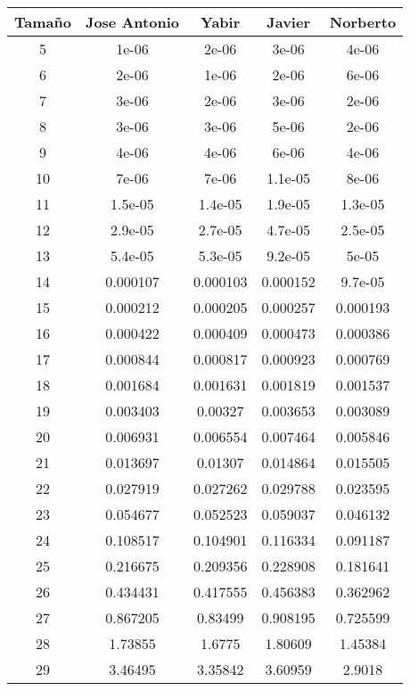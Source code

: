 \documentclass{article}
\begin{document}
 \newpage
{}

\begin{tabular}{ | c | c  | c | c | c | }
  \hline
   Tama\~no & Jose Antonio & Yabir & Javier & Norberto\\ 
   \hline
5	&	1e-06	&	2e-06	&	3e-06	&	4e-06	\\
6	&	2e-06	&	1e-06	&	2e-06	&	6e-06	\\
7	&	3e-06	&	2e-06	&	3e-06	&	2e-06	\\
8	&	3e-06	&	3e-06	&	5e-06	&	2e-06	\\
9	&	4e-06	&	4e-06	&	6e-06	&	4e-06	\\
10	&	7e-06	&	7e-06	&	1.1e-05	&	8e-06	\\
11	&	1.5e-05	&	1.4e-05	&	1.9e-05	&	1.3e-05	\\
12	&	2.9e-05	&	2.7e-05	&	4.7e-05	&	2.5e-05	\\
13	&	5.4e-05	&	5.3e-05	&	9.2e-05	&	5e-05	\\
14	&	0.000107	&	0.000103	&	0.000152	&	9.7e-05	\\
15	&	0.000212	&	0.000205	&	0.000257	&	0.000193	\\
16	&	0.000422	&	0.000409	&	0.000473	&	0.000386	\\
17	&	0.000844	&	0.000817	&	0.000923	&	0.000769	\\
18	&	0.001684	&	0.001631	&	0.001819	&	0.001537	\\
19	&	0.003403	&	0.00327	&	0.003653	&	0.003089	\\
20	&	0.006931	&	0.006554	&	0.007464	&	0.005846	\\
21	&	0.013697	&	0.01307	&	0.014864	&	0.015505	\\
22	&	0.027919	&	0.027262	&	0.029788	&	0.023595	\\
23	&	0.054677	&	0.052523	&	0.059037	&	0.046132	\\
24	&	0.108517	&	0.104901	&	0.116334	&	0.091187	\\
25	&	0.216675	&	0.209356	&	0.228908	&	0.181641	\\
26	&	0.434431	&	0.417555	&	0.456383	&	0.362962	\\
27	&	0.867205	&	0.83499	&	0.908195	&	0.725599	\\
28	&	1.73855	&	1.6775	&	1.80609	&	1.45384	\\
29	&	3.46495	&	3.35842	&	3.60959	&	2.9018	\\

  \hline
 \end{tabular}
\end{document}

